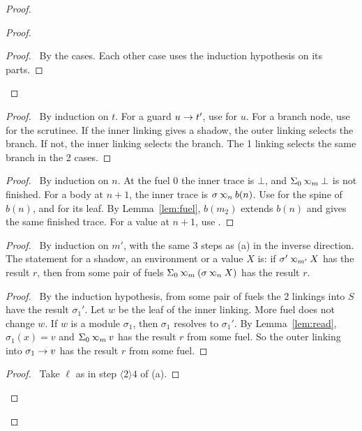 \begin{proof}
\begin{proof}
\begin{proof}
      \pf\ By the cases.
      Each other case uses the induction hypothesis on its parts.
    \end{proof}
  \end{proof}
  \begin{proof}
    \pf\ By induction on $t$.
    For a guard ${u}\rightarrow{t'}$, use  for $u$.
    For a branch node, use  for the scrutinee.
    If the inner linking gives a shadow, the outer linking selects the branch.
    If not, the inner linking selects the branch.
    The 1 linking selects the same branch in the 2 cases.
  \end{proof}
  \begin{proof}
    \pf\ By induction on $n$.
    At the fuel $0$ the inner trace is $\bot$, and $\Sigma_0\lk{m}\bot$ is not finished.
    For a body at $n+1$, the inner trace is $\sigma\lk{n}b(n)$.
    Use  for the spine of $b(n)$, and  for its leaf.
    By Lemma~\ref{lem:fuel}, $b(m_2)$ extends $b(n)$ and gives the same finished trace.
    For a value at $n+1$, use .
  \end{proof}
  \begin{proof}
    \pfsketch\ By induction on $m'$, with the same 3 steps as (a) in the inverse direction.
    The statement for a shadow, an environment or a value $X$ is:
    if $\sigma'\lk{m'}X$ has the result $r$, then from some pair of fuels $\Sigma_0\lk{m}(\sigma\lk{n}X)$ has the result $r$.
    \begin{proof}
      \pf\ By the induction hypothesis, from some pair of fuels the 2 linkings into $S$ have the result $\sigma_1'$.
      Let $w$ be the leaf of the inner linking.
      More fuel does not change $w$.
      If $w$ is a module $\sigma_1$, then $\sigma_1$ resolves to $\sigma_1'$.
      By Lemma~\ref{lem:read}, $\sigma_1(x)=v$ and $\Sigma_0\lk{m}v$ has the result $r$ from some fuel.
      So the outer linking into ${\sigma_1}\rightarrow{v}$ has the result $r$ from some fuel.
    \end{proof}
    \begin{proof}
      \pf\ Take $\ell$ as in step $\langle2\rangle4$ of (a).

\end{proof}
\end{proof}
\end{proof}

